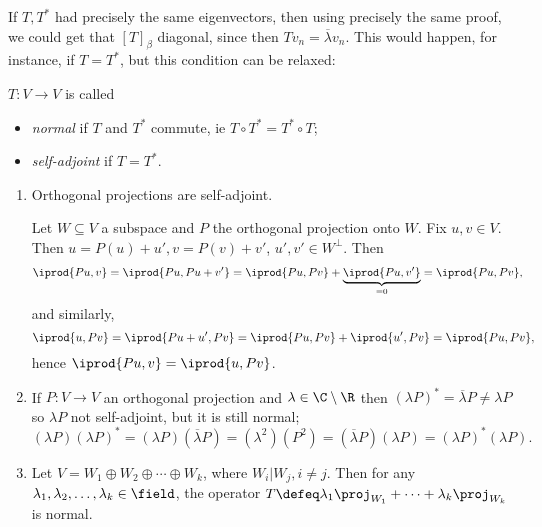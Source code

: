 \begin{remark}
    If $T, T^\ast$ had precisely the same eigenvectors, then using precisely the same proof, we could get that $[T]_\beta$ diagonal, since then $T v_n = \overline{\lambda} v_n$. This would happen, for instance, if $T = T^\ast$, but this condition can be relaxed:
\end{remark}

\begin{definition}[Normality]
    $T : V \to V$ is called \begin{itemize}
        \item \emph{normal} if $T$ and $T^\ast$ commute, ie $T \circ T^\ast = T^\ast \circ T$;
        \item \emph{self-adjoint} if $T = T^\ast$.
    \end{itemize}
\end{definition}

\begin{example}
    \begin{enumerate}[label=(\alph*)]
        \item Orthogonal projections are self-adjoint. 
        
        Let $W \subseteq V$ a subspace and $P$ the orthogonal projection onto $W$. Fix $u, v \in V$. Then $u = P(u) + u', v = P(v) + v'$, $u', v' \in W^\perp$. Then \begin{align*}
            \iprod{Pu, v} = \iprod{Pu, Pu + v'} &= \iprod{Pu, Pv} + \underbrace{\iprod{Pu, v'}}_{= 0}= \iprod{Pu, Pv},
        \end{align*}
        and similarly, \[\iprod{u, Pv} = \iprod{Pu + u', Pv} = \iprod{Pu, Pv} + \iprod{u', Pv} = \iprod{Pu, Pv},\]
        hence $\iprod{Pu, v} = \iprod{u, Pv}$.
        \item If $P : V \to V$ an orthogonal projection and $\lambda \in \C\setminus \R$ then $(\lambda P)^\ast = \overline{\lambda} P \neq \lambda P$ so $\lambda P$ not self-adjoint, but it is still normal; \[
        (\lambda P) (\lambda P)^\ast = (\lambda P)(\overline{\lambda} P) = (\lambda^2)(P^2) = (\overline{\lambda} P)(\lambda P) = (\lambda P)^\ast (\lambda P).
        \]
        \item Let $V = W_1 \oplus W_2 \oplus \cdots \oplus W_k$, where $W_i \vert W_j, i \neq j$. Then for any $\lambda_1, \lambda_2, \dots, \lambda_k \in \field$, the operator $T \defeq \lambda_1 \proj_{W_1} + \cdots + \lambda_k \proj_{W_k}$ is normal.
    \end{enumerate}
\end{example}


